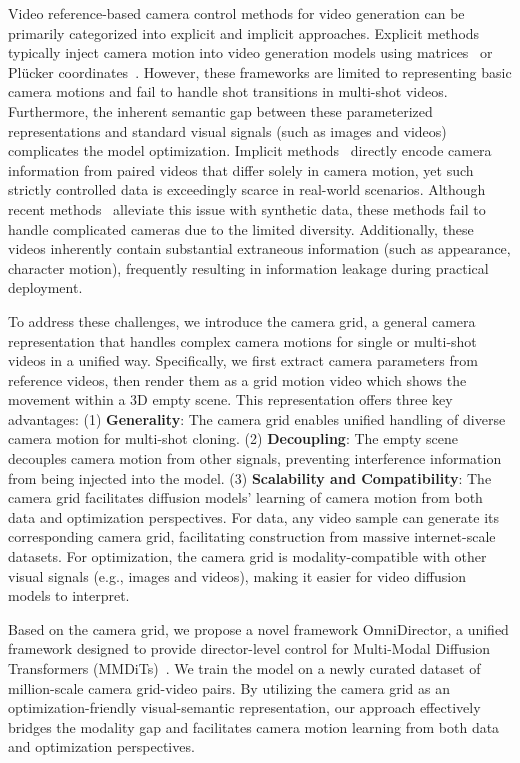 \documentclass[letterpaper]{article} %
\begin{document}
Video reference-based camera control methods for video generation can be primarily categorized into explicit and implicit approaches. Explicit methods~\cite{bai2025recammaster, he2024cameractrl, wu2025cinetrans, meng2026argusstackedmultiviewidentity} typically inject camera motion into video generation models using matrices~\cite{bai2025recammaster} or Plücker coordinates~\cite{he2024cameractrl}. However, these frameworks are limited to representing basic camera motions and fail to handle shot transitions in multi-shot videos. Furthermore, the inherent semantic gap between these parameterized representations and standard visual signals (such as images and videos) complicates the model optimization. 
Implicit methods~\cite{luo2025camclonemaster} directly encode camera information from paired videos that differ solely in camera motion, yet such strictly controlled data is exceedingly scarce in real-world scenarios. Although recent methods~\cite{bai2025recammaster, luo2025camclonemaster} alleviate this issue with synthetic data, these methods fail to handle complicated cameras due to the limited diversity. Additionally, these videos inherently contain substantial extraneous information (such as appearance, character motion), frequently resulting in information leakage during practical deployment. 

To address these challenges, we introduce the camera grid, a general camera representation that handles complex camera motions for single or multi-shot videos in a unified way. Specifically, we first extract camera parameters from reference videos, then render them as a grid motion video which shows the movement within a 3D empty scene. This representation offers three key advantages: (1) \textbf{Generality}: The camera grid enables unified handling of diverse camera motion for multi-shot cloning. (2) \textbf{ Decoupling}: The empty scene decouples camera motion from other signals, preventing interference information from being injected into the model. (3) \textbf{Scalability and Compatibility}: The camera grid facilitates diffusion models' learning of camera motion from both data and optimization perspectives. For data, any video sample can generate its corresponding camera grid, facilitating construction from massive internet-scale datasets. For optimization, the camera grid is modality-compatible with other visual signals (e.g., images and videos), making it easier for video diffusion models to interpret.


Based on the camera grid, we propose a novel framework OmniDirector, a unified framework designed to provide director-level control for Multi-Modal Diffusion Transformers (MMDiTs)~\cite{esser2024scaling}. We train the model on a newly curated dataset of million-scale camera grid-video pairs. By utilizing the camera grid as an optimization-friendly visual-semantic representation, our approach effectively bridges the modality gap and facilitates camera motion learning from both data and optimization perspectives. 
\end{document}
